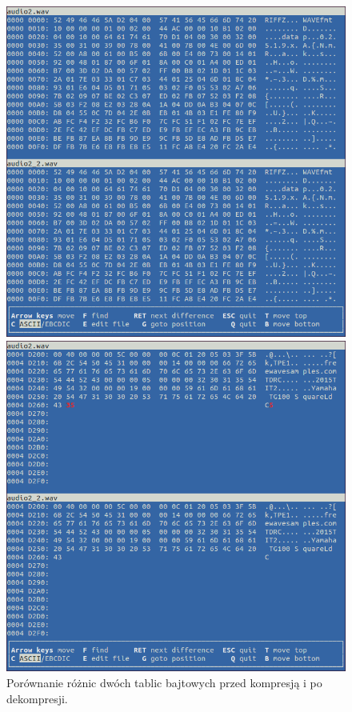 \documentclass[12pt,a4paper,notitlepage]{report}
\begin{document}
\begin{figure}[H]
	\caption{Porównanie różnic dwóch tablic bajtowych przed kompresją i po dekompresji.}
	\centering
	\begin{minipage}{0.45\textwidth}
		\centering
		\includegraphics[scale=.3]{audio2_beg}
	\end{minipage}\hfill
	\begin{minipage}{0.45\textwidth}
		\centering
		\includegraphics[scale=.3]{audio2_end}
	\end{minipage}
\end{figure}
\end{document}
